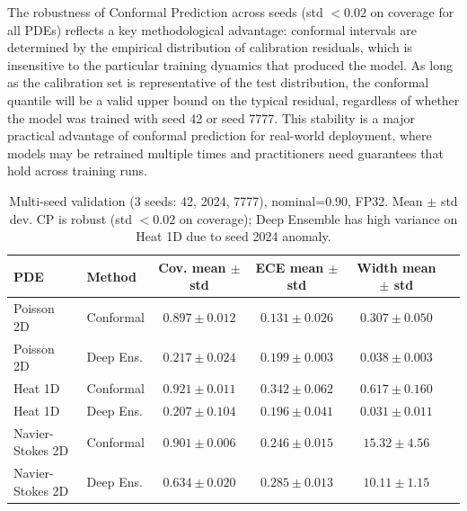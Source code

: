 \documentclass[12pt,a4paper]{article}
\theoremstyle{plain}
\begin{document}
The robustness of Conformal Prediction across seeds (std $< 0.02$ on coverage
for all PDEs) reflects a key methodological advantage: conformal intervals
are determined by the empirical distribution of calibration residuals, which
is insensitive to the particular training dynamics that produced the model.
As long as the calibration set is representative of the test distribution,
the conformal quantile will be a valid upper bound on the typical residual,
regardless of whether the model was trained with seed 42 or seed 7777. This
stability is a major practical advantage of conformal prediction for
real-world deployment, where models may be retrained multiple times and
practitioners need guarantees that hold across training runs.

\begin{table}[ht]
    \centering
    \caption{Multi-seed validation (3 seeds: 42, 2024, 7777), nominal=0.90, FP32.
        Mean $\pm$ std dev.  CP is robust (std $< 0.02$ on coverage);
    Deep Ensemble has high variance on Heat 1D due to seed 2024 anomaly.}
    \begin{tabular}{llcccc}
        \toprule
        \textbf{PDE} & \textbf{Method} &
        \textbf{Cov. mean $\pm$ std} &
        \textbf{ECE mean $\pm$ std} &
        \textbf{Width mean $\pm$ std} \\
        \midrule
        Poisson 2D      & Conformal      & $0.897 \pm 0.012$ & $0.131 \pm 0.026$ & $0.307 \pm 0.050$ \\
        Poisson 2D      & Deep Ens.      & $0.217 \pm 0.024$ & $0.199 \pm 0.003$ & $0.038 \pm 0.003$ \\
        Heat 1D         & Conformal      & $0.921 \pm 0.011$ & $0.342 \pm 0.062$ & $0.617 \pm 0.160$ \\
        Heat 1D         & Deep Ens.      & $0.207 \pm 0.104$ & $0.196 \pm 0.041$ & $0.031 \pm 0.011$ \\
        Navier-Stokes 2D& Conformal      & $0.901 \pm 0.006$ & $0.246 \pm 0.015$ & $15.32 \pm 4.56$ \\
        Navier-Stokes 2D& Deep Ens.      & $0.634 \pm 0.020$ & $0.285 \pm 0.013$ & $10.11 \pm 1.15$ \\
        \bottomrule
    \end{tabular}
    \label{tab:multiseed}
\end{table}
\end{document}
